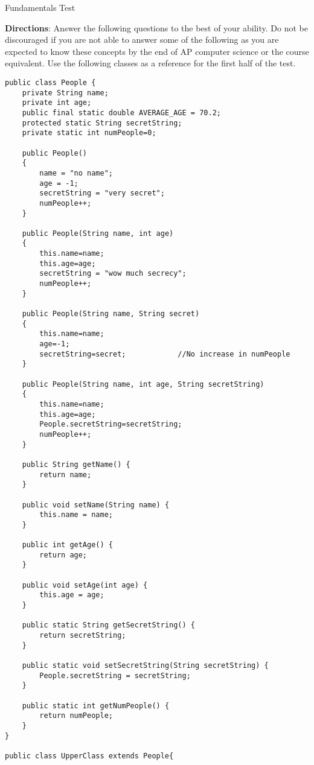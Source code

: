 \documentclass[11pt,fleqn]{article}
\begin{document}
\begin{center}
{\Huge
Fundamentals Test
}
\end{center}

\textbf{Directions}: Answer the following questions to the best of your ability. Do not be discouraged
if you are not able to answer some of the following as you are expected to know these concepts by the
end of AP computer science or the course equivalent. Use the following classes as a reference for
the first half of the test. 

\begin{verbatim}
public class People {
	private String name;
	private int age;
	public final static double AVERAGE_AGE = 70.2;
	protected static String secretString;
	private static int numPeople=0;
	
	public People()
	{
		name = "no name";
		age = -1;
		secretString = "very secret";
		numPeople++;
	}
	
	public People(String name, int age)
	{
		this.name=name;
		this.age=age;
		secretString = "wow much secrecy";
		numPeople++;
	}
	
	public People(String name, String secret)
	{
		this.name=name;
		age=-1;
		secretString=secret;			//No increase in numPeople
	}
	
	public People(String name, int age, String secretString)
	{
		this.name=name;
		this.age=age;
		People.secretString=secretString;
		numPeople++;
	}

	public String getName() {
		return name;
	}

	public void setName(String name) {
		this.name = name;
	}

	public int getAge() {
		return age;
	}

	public void setAge(int age) {
		this.age = age;
	}

	public static String getSecretString() {
		return secretString;
	}

	public static void setSecretString(String secretString) {
		People.secretString = secretString;
	}

	public static int getNumPeople() {
		return numPeople;
	}
}

public class UpperClass extends People{


\end{verbatim}
\end{document}
